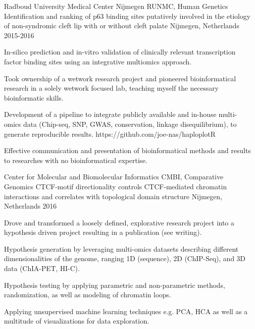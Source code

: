 

\begin{cventries}

  \cventry
    {Radboud University Medical Center Nijmegen RUNMC, Human Genetics} %
    {Identification and ranking of p63 binding sites putatively involved in the etiology of non-syndromic cleft lip with or without cleft palate} %
    {Nijmegen, Netherlands} %
    {2015-2016} %
    { 
      \begin{cvitems} %
        \item {In-silico prediction and in-vitro validation of clinically relevant transcription factor binding sites using an integrative multiomics approach.}
        \item {Took ownership of a wetwork research project and pioneered bioinformatical research in a solely wetwork focused lab, teaching myself the necessary bioinformatic skills.}
        \item {Development of a pipeline to integrate publicly available and in-house multi-omics data (Chip-seq, SNP, GWAS, conservation, linkage disequilibrium), to generate reproducible results. https://github.com/joe-nas/haploplotR}
        \item {Effective communication and presentation of bioinformatical methods and results to researches with no bioinformatical expertise.}
      \end{cvitems}
    }

  \cventry
    {Center for Molecular and Biomolecular Informatics CMBI, Comparative Genomics} %
    {CTCF-motif directionality controls CTCF-mediated chromatin interactions and correlates with topological domain structure} %
    {Nijmegen, Netherlands} %
    {2016} %
    {
      \begin{cvitems} %
        \item {Drove and transformed a loosely defined, explorative research project into a hypothesis driven project resulting in a publication (see writing).}
        \item {Hypothesis generation by leveraging multi-omics datasets describing different dimensionalities of the genome, ranging 1D (sequence), 2D (ChIP-Seq), and 3D data (ChIA-PET, HI-C).}
        \item {Hypothesis testing by applying parametric and non-parametric methods, randomization, as well as modeling of chromatin loops.}
        \item {Applying unsupervised machine learning techniques e.g. PCA, HCA as well as a multitude of visualizations for data exploration.}
      \end{cvitems}
    }


\end{cventries}
